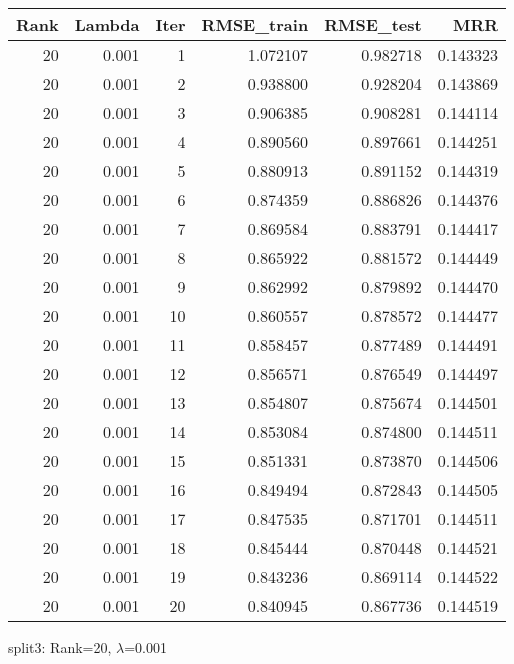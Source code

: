 \begin{tabular}{rrrrrr}
\toprule
 Rank &  Lambda &  Iter &  RMSE\_train &  RMSE\_test &       MRR \\
\midrule
   20 &   0.001 &     1 &    1.072107 &   0.982718 &  0.143323 \\
   20 &   0.001 &     2 &    0.938800 &   0.928204 &  0.143869 \\
   20 &   0.001 &     3 &    0.906385 &   0.908281 &  0.144114 \\
   20 &   0.001 &     4 &    0.890560 &   0.897661 &  0.144251 \\
   20 &   0.001 &     5 &    0.880913 &   0.891152 &  0.144319 \\
   20 &   0.001 &     6 &    0.874359 &   0.886826 &  0.144376 \\
   20 &   0.001 &     7 &    0.869584 &   0.883791 &  0.144417 \\
   20 &   0.001 &     8 &    0.865922 &   0.881572 &  0.144449 \\
   20 &   0.001 &     9 &    0.862992 &   0.879892 &  0.144470 \\
   20 &   0.001 &    10 &    0.860557 &   0.878572 &  0.144477 \\
   20 &   0.001 &    11 &    0.858457 &   0.877489 &  0.144491 \\
   20 &   0.001 &    12 &    0.856571 &   0.876549 &  0.144497 \\
   20 &   0.001 &    13 &    0.854807 &   0.875674 &  0.144501 \\
   20 &   0.001 &    14 &    0.853084 &   0.874800 &  0.144511 \\
   20 &   0.001 &    15 &    0.851331 &   0.873870 &  0.144506 \\
   20 &   0.001 &    16 &    0.849494 &   0.872843 &  0.144505 \\
   20 &   0.001 &    17 &    0.847535 &   0.871701 &  0.144511 \\
   20 &   0.001 &    18 &    0.845444 &   0.870448 &  0.144521 \\
   20 &   0.001 &    19 &    0.843236 &   0.869114 &  0.144522 \\
   20 &   0.001 &    20 &    0.840945 &   0.867736 &  0.144519 \\
\bottomrule
\end{tabular}

\caption{split3: Rank=20, $\lambda$=0.001}
